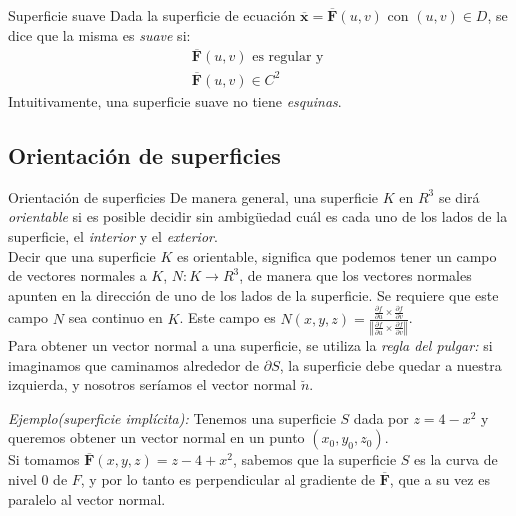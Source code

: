\documentclass[a4paper, twoside]{article}
\numberwithin{equation}{section}
\numberwithin{figure}{section}
\numberwithin{table}{section}
\newcommand{\vect}[1]{\overline{\textbf{#1}}}
\begin{document}
\begin{definicion*}{Superficie suave}
	Dada la superficie de ecuación $\vect{x} = \vect{F}(u,v)$ con $(u,v) \in D$, se dice que la misma es \emph{suave} si:
	\begin{align}
		\vect{F}(u,v) \text{ es regular y }\\
		\vect{F}(u,v) \in C^2
	\end{align}
	Intuitivamente, una superficie suave no tiene \emph{esquinas}.
\end{definicion*}

\subsection{Orientación de superficies}
\begin{definicion*}{Orientación de superficies}
	De manera general, una superficie $K$ en $R^3$ se dirá \emph{orientable} si es posible decidir sin ambigüedad cuál es cada uno de los lados de la superficie, el \emph{interior} y el \emph{exterior}.\\
	
	Decir que una superficie $K$ es orientable, significa que podemos tener un campo de vectores normales a $K$, $N:K \to R^3$, de manera que los vectores normales apunten en la dirección de uno de los lados de la superficie. Se requiere que este campo $N$ sea continuo en $K$. Este campo es $N(x,y,z)=\frac{\frac{\partial f}{\partial u}\times\frac{\partial f}{\partial v}}{\left\Vert \frac{\partial f}{\partial u}\times\frac{\partial f}{\partial v}\right\Vert }$.\\
	
	Para obtener un vector normal a una superficie, se utiliza la \emph{regla del pulgar:} si imaginamos que caminamos alrededor de $\partial S$, la superficie debe quedar a nuestra izquierda, y nosotros seríamos el vector normal $\breve{n}$.\\
\end{definicion*}

\emph{Ejemplo(superficie implícita):} Tenemos una superficie $S$ dada por $z=4-x^{2}$ y queremos obtener un vector normal en un punto $(x_{0},y_{0},z_{0})$.\\

Si tomamos $\vect{F}(x,y,z)=z-4+x^{2}$, sabemos que la superficie $S$ es la curva de nivel $0$ de $F$, y por lo tanto es perpendicular al gradiente de $\vect{F}$, que a su vez es paralelo al vector normal.\\
\end{document}
